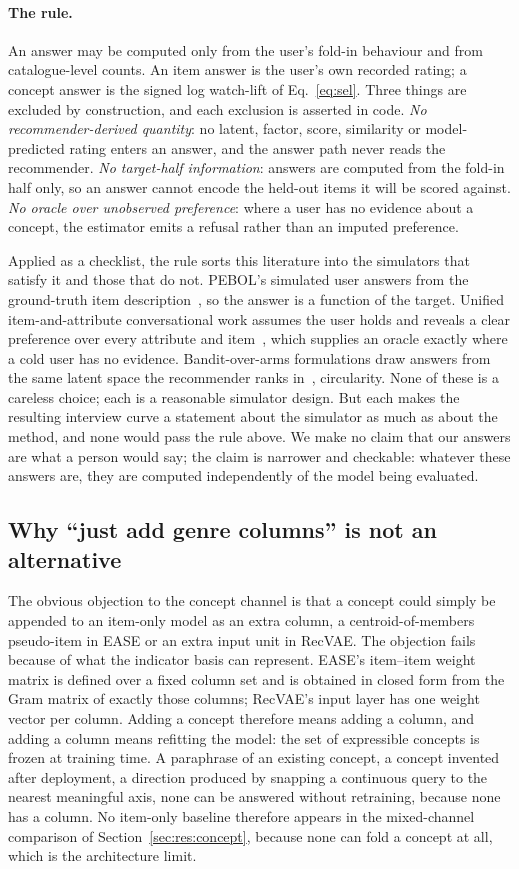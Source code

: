 \documentclass[manuscript,screen,review]{acmart}
\begin{document}
\paragraph{The rule.} An answer may be computed only from the user's fold-in behaviour and from catalogue-level counts. An item answer is the user's own recorded rating; a concept answer is the signed log watch-lift of Eq.~\eqref{eq:sel}. Three things are excluded by construction, and each exclusion is asserted in code. \emph{No recommender-derived quantity}: no latent, factor, score, similarity or model-predicted rating enters an answer, and the answer path never reads the recommender. \emph{No target-half information}: answers are computed from the fold-in half only, so an answer cannot encode the held-out items it will be scored against. \emph{No oracle over unobserved preference}: where a user has no evidence about a concept, the estimator emits a refusal rather than an imputed preference.

Applied as a checklist, the rule sorts this literature into the simulators that satisfy it and those that do not. PEBOL's simulated user answers from the ground-truth item description~\citep{austin2024bayesian}, so the answer is a function of the target. Unified item-and-attribute conversational work assumes the user holds and reveals a clear preference over every attribute and item~\citep{deng2021unicorn}, which supplies an oracle exactly where a cold user has no evidence. Bandit-over-arms formulations draw answers from the same latent space the recommender ranks in~\citep{li2021seamlessly}, circularity. None of these is a careless choice; each is a reasonable simulator design. But each makes the resulting interview curve a statement about the simulator as much as about the method, and none would pass the rule above. We make no claim that our answers are what a person would say; the claim is narrower and checkable: whatever these answers are, they are computed independently of the model being evaluated.

\subsection{Why ``just add genre columns'' is not an alternative}\label{sec:setup:columns}
The obvious objection to the concept channel is that a concept could simply be appended to an item-only model as an extra column, a centroid-of-members pseudo-item in EASE or an extra input unit in RecVAE. The objection fails because of what the indicator basis can represent. EASE's item--item weight matrix is defined over a fixed column set and is obtained in closed form from the Gram matrix of exactly those columns; RecVAE's input layer has one weight vector per column. Adding a concept therefore means adding a column, and adding a column means refitting the model: the set of expressible concepts is frozen at training time. A paraphrase of an existing concept, a concept invented after deployment, a direction produced by snapping a continuous query to the nearest meaningful axis, none can be answered without retraining, because none has a column. No item-only baseline therefore appears in the mixed-channel comparison of Section~\ref{sec:res:concept}, because none can fold a concept at all, which is the architecture limit.
\end{document}
